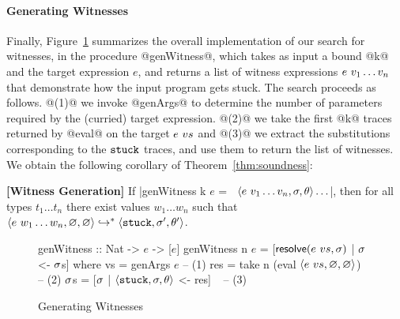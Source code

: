 \paragraph{Generating Witnesses}
%
Finally, Figure~\ref{fig:algo-gen-witness} summarizes the overall
implementation of our search for witnesses, in the procedure @genWitness@,
which takes as input a bound @k@ and the target expression $e$, and
returns a list of witness expressions $e\ v_1 \ldots v_n$ that demonstrate how the input
program gets stuck.
%
The search proceeds as follows.
%
@(1)@ we invoke @genArgs@ to determine the number of parameters required
by the (curried) target expression.
%
%
@(2)@ we take the first @k@ traces returned by @eval@ on the target $e\ vs$
and
@(3)@ we extract the substitutions corresponding to the $\mathtt{stuck}$ traces,
and use them to return the list of witnesses.
%
We obtain the following corollary of Theorem~\ref{thm:soundness}:

\begin{cor}{\textbf{[Witness Generation]}}
\label{thm:generation}
  If |genWitness k $e$ = $\ $ $\langle e\ v_1 \ldots v_n, \sigma, \theta \rangle\ldots$|,
  then for all types $t_1 \ldots t_n$ there exist values $w_1 \ldots w_n$ such that
  $\langle e\ w_1 \ldots w_n, \varnothing, \varnothing \rangle \hookrightarrow^{*} \langle \mathtt{stuck}, \sigma', \theta' \rangle{}$.
\end{cor}

\begin{figure}[t]
\centering

\begin{mcode}
genWitness :: Nat -> $e$ -> [$e$]
genWitness n $e$ = [$\mathsf{resolve}(e\ vs, \sigma)$ | $\sigma$ <- $\sigma$s]
  where
   vs  = genArgs $e$                  -- (1)
   res = take n (eval $\langle e\ vs, \varnothing, \varnothing \rangle$) $\ $  -- (2)
   $\sigma$s   = [$\sigma$ | $\langle \mathtt{stuck}, \sigma, \theta \rangle$ <- res] $\ \ $   -- (3)
\end{mcode}
\caption{Generating Witnesses}
\label{fig:algo-gen-witness}
\end{figure}

